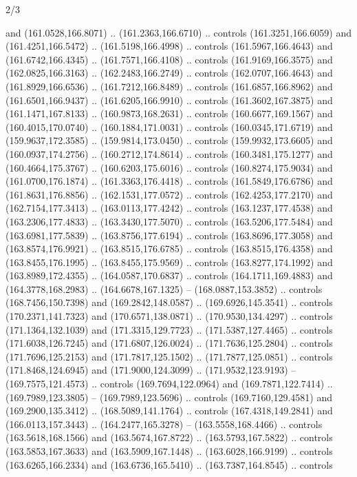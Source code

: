 \begin{flagdescription}{2/3}
\begin{scope}[shift={(0.5\flaglength,0.5)},scale=\flagwidth/320]
\begin{scope}[y=0.8pt, x=0.8pt, yscale=-1,shift={(-118.3,-146)}]
  and (161.0528,166.8071) .. (161.2363,166.6710) .. controls (161.3251,166.6059)
  and (161.4251,166.5472) .. (161.5198,166.4998) .. controls (161.5967,166.4643)
  and (161.6742,166.4345) .. (161.7571,166.4108) .. controls (161.9169,166.3575)
  and (162.0825,166.3163) .. (162.2483,166.2749) .. controls (162.0707,166.4643)
  and (161.8929,166.6536) .. (161.7212,166.8489) .. controls (161.6857,166.8962)
  and (161.6501,166.9437) .. (161.6205,166.9910) .. controls (161.3602,167.3875)
  and (161.1471,167.8133) .. (160.9873,168.2631) .. controls (160.6677,169.1567)
  and (160.4015,170.0740) .. (160.1884,171.0031) .. controls (160.0345,171.6719)
  and (159.9637,172.3585) .. (159.9814,173.0450) .. controls (159.9932,173.6605)
  and (160.0937,174.2756) .. (160.2712,174.8614) .. controls (160.3481,175.1277)
  and (160.4664,175.3767) .. (160.6203,175.6016) .. controls (160.8274,175.9034)
  and (161.0700,176.1874) .. (161.3363,176.4418) .. controls (161.5849,176.6786)
  and (161.8631,176.8856) .. (162.1531,177.0572) .. controls (162.4253,177.2170)
  and (162.7154,177.3413) .. (163.0113,177.4242) .. controls (163.1237,177.4538)
  and (163.2306,177.4833) .. (163.3430,177.5070) .. controls (163.5206,177.5484)
  and (163.6981,177.5839) .. (163.8756,177.6194) .. controls (163.8696,177.3058)
  and (163.8574,176.9921) .. (163.8515,176.6785) .. controls (163.8515,176.4358)
  and (163.8455,176.1995) .. (163.8455,175.9569) .. controls (163.8277,174.1992)
  and (163.8989,172.4355) .. (164.0587,170.6837) .. controls (164.1711,169.4883)
  and (164.3778,168.2983) .. (164.6678,167.1325) -- (168.0887,153.3852) ..
  controls (168.7456,150.7398) and (169.2842,148.0587) .. (169.6926,145.3541) ..
  controls (170.2371,141.7323) and (170.6571,138.0871) .. (170.9530,134.4297) ..
  controls (171.1364,132.1039) and (171.3315,129.7723) .. (171.5387,127.4465) ..
  controls (171.6038,126.7245) and (171.6807,126.0024) .. (171.7636,125.2804) ..
  controls (171.7696,125.2153) and (171.7817,125.1502) .. (171.7877,125.0851) ..
  controls (171.8468,124.6945) and (171.9000,124.3099) .. (171.9532,123.9193) --
  (169.7575,121.4573) .. controls (169.7694,122.0964) and (169.7871,122.7414) ..
  (169.7989,123.3805) -- (169.7989,123.5696) .. controls (169.7160,129.4581) and
  (169.2900,135.3412) .. (168.5089,141.1764) .. controls (167.4318,149.2841) and
  (166.0113,157.3443) .. (164.2477,165.3278) -- (163.5558,168.4466) .. controls
  (163.5618,168.1566) and (163.5674,167.8722) .. (163.5793,167.5822) .. controls
  (163.5853,167.3633) and (163.5909,167.1448) .. (163.6028,166.9199) .. controls
  (163.6265,166.2334) and (163.6736,165.5410) .. (163.7387,164.8545) .. controls

\end{scope}
\end{scope}
\end{flagdescription}
